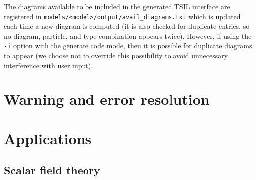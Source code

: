 The diagrams available to be included in the generated TSIL interface are registered in \lstinline{models/<model>/output/avail_diagrams.txt} which is updated each time a new diagram is computed (it is also checked for duplicate entries, so no diagram, particle, and type combination appears twice).  However, if using the \lstinline{-i} option with the generate code mode, then it is possible for duplicate diagrams to appear (we choose not to override this possibility to avoid unnecessary interference with user input).


\section{Warning and error resolution}\label{errors}

\section{Applications}

\subsection{Scalar field theory}




{}


  